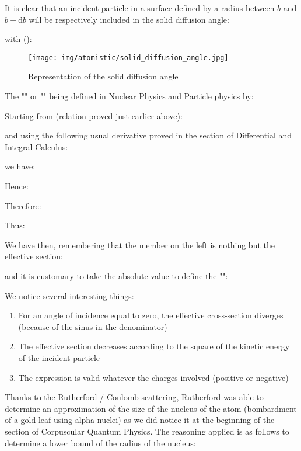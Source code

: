 	It is clear that an incident particle in a surface defined by a radius between $b$ and $b + \mathrm{d}b$ will be respectively included in the solid diffusion angle:
	
	with ():
	
	\begin{figure}[H]
		\centering
		\texttt{[image: img/atomistic/solid\_diffusion\_angle.jpg]}
		\caption{Representation of the solid diffusion angle}
	\end{figure}
	The "" or "" being defined in Nuclear Physics and Particle physics by:
	
	Starting from (relation proved just earlier above):
	
	and using the following usual derivative proved in the section of Differential and Integral Calculus:
	
	we have:
	
	Hence:
	
	Therefore:
	
	Thus:
	
	We have then, remembering that the member on the left is nothing but the effective section:
	
	and it is customary to take the absolute value to define the "":
	
	We notice several interesting things:
	\begin{enumerate}
		\item For an angle of incidence equal to zero, the effective cross-section diverges (because of the sinus in the denominator)

		\item The effective section decreases according to the square of the kinetic energy of the incident particle

		\item The expression is valid whatever the charges involved (positive or negative)
	\end{enumerate}
	Thanks to the Rutherford / Coulomb scattering, Rutherford was able to determine an approximation of the size of the nucleus of the atom (bombardment of a gold leaf using alpha nuclei) as we did notice it at the beginning of the section of Corpuscular Quantum Physics. The reasoning applied is as follows to determine a lower bound of the radius of the nucleus:
	
